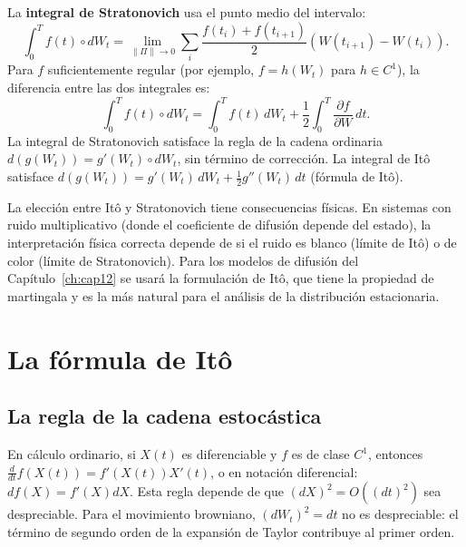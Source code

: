 La \textbf{integral de Stratonovich} usa el punto medio del intervalo:
\begin{equation}
  \int_0^T f(t) \circ dW_t
  = \lim_{\|\Pi\|\to 0}\sum_i
  \frac{f(t_i)+f(t_{i+1})}{2}(W(t_{i+1})-W(t_i)).
  \label{eq:stratonovich}
\end{equation}
Para $f$ suficientemente regular (por ejemplo, $f = h(W_t)$ para $h \in C^1$),
la diferencia entre las dos integrales es:
\begin{equation}
  \int_0^T f(t) \circ dW_t
  = \int_0^T f(t)\,dW_t + \frac{1}{2}\int_0^T \frac{\partial f}{\partial W}\,dt.
  \label{eq:ito_strat}
\end{equation}
La integral de Stratonovich satisface la regla de la cadena ordinaria $d(g(W_t))
= g'(W_t) \circ dW_t$, sin término de corrección. La integral de Itô satisface
$d(g(W_t)) = g'(W_t)\,dW_t + \frac{1}{2}g''(W_t)\,dt$ (fórmula de Itô).

La elección entre Itô y Stratonovich tiene consecuencias físicas. En sistemas
con ruido multiplicativo (donde el coeficiente de difusión depende del estado),
la interpretación física correcta depende de si el ruido es blanco (límite de
Itô) o de color (límite de Stratonovich). Para los modelos de difusión del
Capítulo~\ref{ch:cap12} se usará la formulación de Itô, que tiene la propiedad de martingala
y es la más natural para el análisis de la distribución estacionaria.

\section{La fórmula de Itô}
\label{sec:formula_ito}

\subsection{La regla de la cadena estocástica}
\label{subsec:cadena_estocastica}

En cálculo ordinario, si $X(t)$ es diferenciable y $f$ es de clase $C^1$,
entonces $\frac{d}{dt}f(X(t)) = f'(X(t))X'(t)$, o en notación diferencial:
$df(X) = f'(X)dX$. Esta regla depende de que $(dX)^2 = O((dt)^2)$ sea
despreciable. Para el movimiento browniano, $(dW_t)^2 = dt$ no es despreciable:
el término de segundo orden de la expansión de Taylor contribuye al primer orden.

